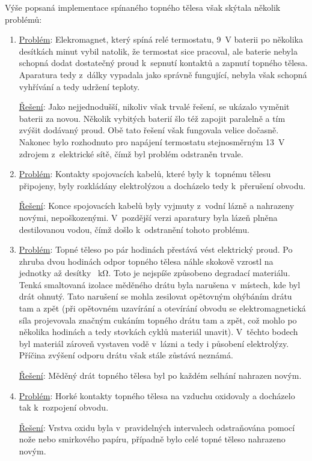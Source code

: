 \documentclass[12pt]{article}
\begin{document}
Výše popsaná implementace spínaného topného tělesa však skýtala několik problémů:
\begin{enumerate}[noitemsep, topsep = 0pt]
    \item \underline{Problém}: Elekromagnet, který spíná relé termostatu, \SI{9}{\volt} baterii po několika desítkách minut vybil natolik, že termostat sice pracoval, ale baterie nebyla schopná dodat dostatečný proud k~sepnutí kontaktů a zapnutí topného tělesa. Aparatura tedy z~dálky vypadala jako správně fungující, nebyla však schopná vyhřívání a tedy udržení teploty.
    \par \underline{Řešení}: Jako nejjednodušší, nikoliv však trvalé řešení, se ukázalo vyměnit baterii za novou. Několik vybitých baterií šlo též zapojit paralelně a tím zvýšit dodávaný proud. Obě tato řešení však fungovala velice dočasně. Nakonec bylo rozhodnuto pro napájení termostatu stejnosměrným \SI{13}{\volt} zdrojem z~elektrické sítě, čímž byl problém odstraněn trvale.
    \item \underline{Problém}: Kontakty spojovacích kabelů, které byly k~topnému tělesu připojeny, byly rozkládány elektrolýzou a docházelo tedy k~přerušení obvodu.
    \par \underline{Řešení}: Konce spojovacích kabelů byly vyjmuty z~vodní lázně a nahrazeny novými, nepoškozenými. V~pozdější verzi aparatury byla lázeň plněna destilovanou vodou, čímž došlo k~odstranění tohoto problému.
    \item \underline{Problém}: Topné těleso po pár hodinách přestává vést elektrický proud. Po zhruba dvou hodinách odpor topného tělesa náhle skokově vzrostl na jednotky až desítky \SI{}{\kilo\ohm}. Toto je nejspíše způsobeno degradací materiálu. Tenká smaltovaná izolace měděného drátu byla narušena v~místech, kde byl drát ohnutý. Tato narušení se mohla zesilovat opětovným ohýbáním drátu tam a zpět (při opětovném uzavírání a otevírání obvodu se elektromagnetická síla projevovala značným cukáním topného drátu tam a zpět, což mohlo po několika hodinách a tedy stovkách cyklů materiál unavit). V~těchto bodech byl materiál zároveň vystaven vodě v~lázni a tedy i působení elektrolýzy. Příčina zvýšení odporu drátu však stále zůstává neznámá.
    \par \underline{Řešení}: Měděný drát topného tělesa byl po každém selhání nahrazen novým.
    \item \underline{Problém}: Horké kontakty topného tělesa na vzduchu oxidovaly a docházelo tak k~rozpojení obvodu.
    \par \underline{Řešení}: Vrstva oxidu byla v~pravidelných intervalech odstraňována pomocí nože nebo smirkového papíru, případně bylo celé topné těleso nahrazeno novým.

\end{enumerate}
\end{document}
